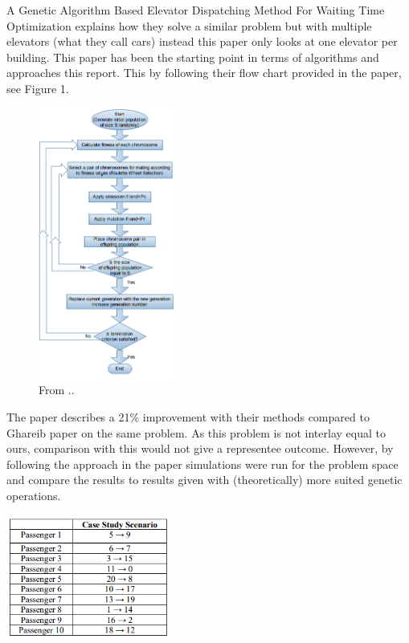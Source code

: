 
A Genetic Algorithm Based Elevator Dispatching Method For Waiting Time Optimization \cite{tartan2016genetic} explains how they solve a similar problem but with multiple elevators (what they call cars) instead this paper only looks at one elevator per building. This paper has been the starting point in terms of algorithms and approaches this report. This by following their flow chart provided in the paper, see Figure 1. 

\begin{figure}[h!]
\centering
\includegraphics[width=0.4\textwidth]{diagram_1.png}
\caption{From ..}
	\label{fig:Flow_1}
\end{figure}
The paper describes a 21\% improvement with their methods compared to Ghareib paper \cite{gharieb2005optimal} on the same problem. As this problem is not interlay equal to ours, comparison with this would not give a representee outcome. However, by following the approach in the paper simulations were run for the problem space and compare the results to results given with (theoretically) more suited genetic operations.
\newpage

\begin{figure1}[h!]
\centering
\includegraphics[width=0.4\textwidth]{tabel_1.png}
\caption{From ..}
\end{figure1}

